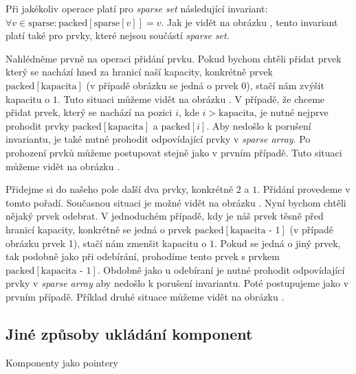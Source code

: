 
Při jakékoliv operace platí pro \textit{sparse set} následující invariant: $\forall v \in \text{sparse}: \text{packed}\left[\text{sparse}\left[v\right]\right] = v$. Jak je vidět na obrázku , tento invariant platí také pro prvky, které nejsou součástí \textit{sparse set}.

Nahlédněme prvně na operaci přidání prvku. Pokud bychom chtěli přidat prvek který se nachází hned za hranicí naší kapacity, konkrétně prvek $\text{packed}\left[\text{kapacita}\right]$ (v případě obrázku  se jedná o prvek $0$), stačí nám zvýšit kapacitu o $1$. Tuto situaci můžeme vidět na obrázku . V případě, že chceme přidat prvek, který se nachází na pozici $i$, kde $i > \text{kapacita}$, je nutné nejprve prohodit prvky $\text{packed}\left[\text{kapacita}\right]$ a $\text{packed}\left[i\right]$. Aby nedošlo k porušení invariantu, je také nutné prohodit odpovídající prvky v \textit{sparse array}. Po prohození prvků můžeme postupovat stejně jako v prvním případě. Tuto situaci můžeme vidět na obrázku .



Přidejme si do našeho pole další dva prvky, konkrétně $2$ a $1$. Přidání provedeme v tomto pořadí. Současnou situaci je možné vidět na obrázku . Nyní bychom chtěli nějaký prvek odebrat. V jednoduchém případě, kdy je náš prvek těsně před hranicí kapacity, konkrétně se jedná o prvek $\text{packed}\left[\text{kapacita - 1}\right]$ (v případě obrázku  prvek 1), stačí nám zmenšit kapacitu o $1$. Pokud se jedná o jiný prvek, tak podobně jako při odebírání, prohodíme tento prvek s prvkem $\text{packed}\left[\text{kapacita - 1}\right]$. Obdobně jako u odebíraní je nutné prohodit odpovídající prvky v \textit{sparse array} aby nedošlo k porušení invariantu. Poté postupujeme jako v prvním případě. Příklad druhé situace můžeme vidět na obrázku .



\subsection{Jiné způsoby ukládání komponent}
Komponenty jako pointery

